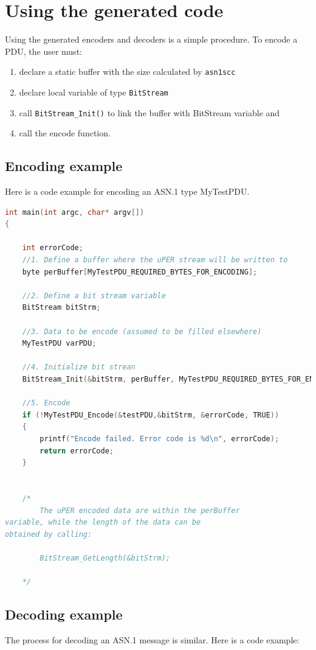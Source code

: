 \documentclass[11pt]{book}
\begin{document}
   \section{Using the generated code}
   Using the generated encoders and decoders is a simple procedure. 
   To encode a PDU, the user must:
   \begin{enumerate}
      \item
         declare a static buffer with the size calculated by \texttt{asn1scc}
      \item
         declare local variable of type \texttt{BitStream}
      \item
         call \texttt{BitStream\_Init()} to link the buffer with BitStream variable and 
      \item
         call the encode function.
    \end{enumerate}

      \subsection{Encoding example}
      Here is a code example for encoding an ASN.1 type MyTestPDU.

\begin{lstlisting}[language=c]
int main(int argc, char* argv[])
{

	int errorCode;
	//1. Define a buffer where the uPER stream will be written to
	byte perBuffer[MyTestPDU_REQUIRED_BYTES_FOR_ENCODING];
	
	//2. Define a bit stream variable
	BitStream bitStrm;
	
	//3. Data to be encode (assumed to be filled elsewhere)
	MyTestPDU varPDU;

	//4. Initialize bit strean
	BitStream_Init(&bitStrm, perBuffer, MyTestPDU_REQUIRED_BYTES_FOR_ENCODING);

	//5. Encode
	if (!MyTestPDU_Encode(&testPDU,&bitStrm, &errorCode, TRUE)) 
	{
		printf("Encode failed. Error code is %d\n", errorCode);
		return errorCode;
	}


	/*
		The uPER encoded data are within the perBuffer
variable, while the length of the data can be 
obtained by calling:

		BitStream_GetLength(&bitStrm);

	*/
\end{lstlisting}


      \subsection{Decoding example}
      The process for decoding an ASN.1 message is similar.  Here is a code example:
\end{document}

